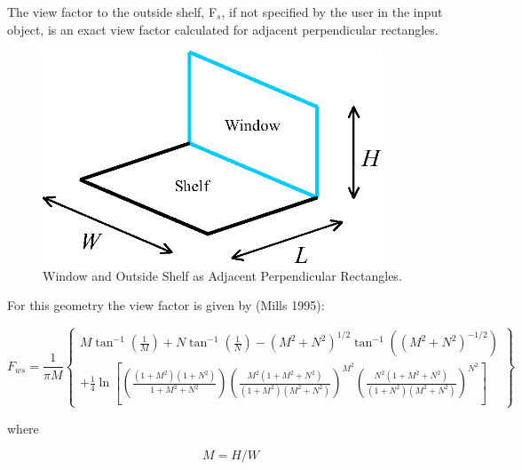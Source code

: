 The view factor to the outside shelf, F\(_{s}\), if not specified by the user in the input object, is an exact view factor calculated for adjacent perpendicular rectangles.

\begin{figure}[hbtp] %
\centering
\includegraphics[width=0.9\textwidth, height=0.9\textheight, keepaspectratio=true]{media/image899.png}
\caption{  Window and Outside Shelf as Adjacent Perpendicular Rectangles. \protect \label{fig:window-and-outside-shelf-as-adjacent}}
\end{figure}

For this geometry the view factor is given by (Mills 1995):

\begin{equation}
{F_{ws}} = \frac{1}{{\pi M}}\left\{ \begin{array}{l}M{\tan ^{ - 1}}\left( {\frac{1}{M}} \right) + N{\tan ^{ - 1}}\left( {\frac{1}{N}} \right) - {\left( {{M^2} + {N^2}} \right)^{1/2}}{\tan ^{ - 1}}\left( {{{\left( {{M^2} + {N^2}} \right)}^{ - 1/2}}} \right)\\ + \frac{1}{4}\ln \left[ {\left( {\frac{{\left( {1 + {M^2}} \right)\left( {1 + {N^2}} \right)}}{{1 + {M^2} + {N^2}}}} \right){{\left( {\frac{{{M^2}\left( {1 + {M^2} + {N^2}} \right)}}{{\left( {1 + {M^2}} \right)\left( {{M^2} + {N^2}} \right)}}} \right)}^{{M^2}}}{{\left( {\frac{{{N^2}\left( {1 + {M^2} + {N^2}} \right)}}{{\left( {1 + {N^2}} \right)\left( {{M^2} + {N^2}} \right)}}} \right)}^{{N^2}}}} \right]\end{array} \right\}
\end{equation}

where

\begin{equation}
M = H/W
\end{equation}

